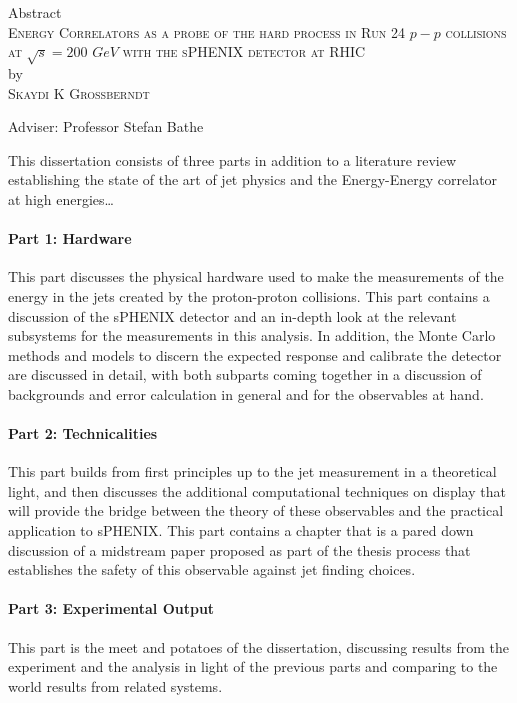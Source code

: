 \begin{center}
Abstract \\
\textsc{Energy Correlators as a probe of the hard process in Run 24 $p-p$ collisions at $\sqrt{s}=200$ $GeV$ with the sPHENIX detector at RHIC} \\
by \\
\textsc{Skaydi K Grossberndt} \\[0.25in]
\end{center}

\vspace{0.25in}

\noindent Adviser: Professor Stefan Bathe

\vspace{0.25in}

\noindent This dissertation consists of three parts in addition to a literature review establishing the state of the art of jet physics and the Energy-Energy correlator at high energies\ldots

\paragraph{Part 1: Hardware} %
This part discusses the physical hardware used to make the measurements of the energy in the jets created by the proton-proton collisions. 
This part contains a discussion of the sPHENIX detector and an in-depth look at the relevant subsystems for the measurements in this analysis. 
In addition, the Monte Carlo methods and models to discern the expected response and calibrate the detector are discussed in detail, with both subparts coming together in a discussion of backgrounds and error calculation in general and for the observables at hand.
\paragraph{Part 2: Technicalities} %
This part builds from first principles up to the jet measurement in a theoretical light, and then discusses the additional computational techniques on display that will provide the bridge between the theory of these observables and the practical application to sPHENIX. 
This part contains a chapter that is a pared down discussion of a midstream paper proposed as part of the thesis process that establishes the safety of this observable against jet finding choices.
\paragraph{Part 3: Experimental Output} %
This part is the meet and potatoes of the dissertation, discussing results from the experiment and the analysis in light of the previous parts and comparing to the world results from related systems.

